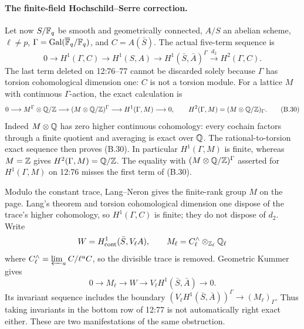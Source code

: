 \paragraph{The finite-field Hochschild--Serre correction.}
Let now \(S/\mathbb F_q\) be smooth and geometrically connected,
\(A/S\) an abelian scheme, \(\ell\ne p\),
\(\Gamma=\operatorname{Gal}(\overline{\mathbb F}_q/\mathbb F_q)\), and
\(C=A(\bar S)\).  The actual five-term sequence is
\[
0\longrightarrow H^1(\Gamma,C)\longrightarrow H^1(S,A)
\longrightarrow H^1(\bar S,\bar A)^\Gamma
\xrightarrow{d_2}H^2(\Gamma,C).\tag{B.29}
\]
The last term deleted on 12:76--77 cannot be discarded solely
because \(\Gamma\) has torsion cohomological dimension one: \(C\)
is not a torsion module.  For a lattice \(M\) with continuous
\(\Gamma\)-action, the exact calculation is
\[
0\longrightarrow M^\Gamma\otimes\mathbb Q/\mathbb Z
\longrightarrow(M\otimes\mathbb Q/\mathbb Z)^\Gamma
\longrightarrow H^1(\Gamma,M)\longrightarrow0,
\qquad
H^2(\Gamma,M)=(M\otimes\mathbb Q/\mathbb Z)_\Gamma.\tag{B.30}
\]
Indeed \(M\otimes\mathbb Q\) has zero higher continuous cohomology:
every cochain factors through a finite quotient and averaging is
exact over \(\mathbb Q\).  The rational-to-torsion exact sequence then
proves (B.30).  In particular \(H^1(\Gamma,M)\) is finite,
whereas \(M=\mathbb Z\) gives \(H^2(\Gamma,M)=\mathbb Q/\mathbb Z\).
The equality with \((M\otimes\mathbb Q/\mathbb Z)^\Gamma\) asserted for
\(H^1(\Gamma,M)\) on 12:76 misses the first term of (B.30).

Modulo the constant trace, Lang--Neron gives the finite-rank group
\(M\) on the page.  Lang's theorem and torsion cohomological
dimension one dispose of the trace's higher cohomology, so
\(H^1(\Gamma,C)\) is finite; they do not dispose of \(d_2\).
Write
\[
 W=H^1_{\mathrm{cont}}(\bar S,V_\ell A),\qquad
 M_\ell=C^{\wedge}_\ell\otimes_{\mathbb Z_\ell}\mathbb Q_\ell
\]
where \(C^{\wedge}_\ell=\varprojlim_a C/\ell^a C\), so the
divisible trace is removed.  Geometric Kummer
gives
\[
 0\longrightarrow M_\ell\longrightarrow W
 \longrightarrow V_\ell H^1(\bar S,\bar A)
 \longrightarrow0.\tag{B.31}
\]
Its invariant sequence includes the boundary
\((V_\ell H^1(\bar S,\bar A))^\Gamma\to(M_\ell)_\Gamma\).
Thus taking invariants in the bottom row of 12:77 is not
automatically right exact either.  These are two manifestations of
the same obstruction.

